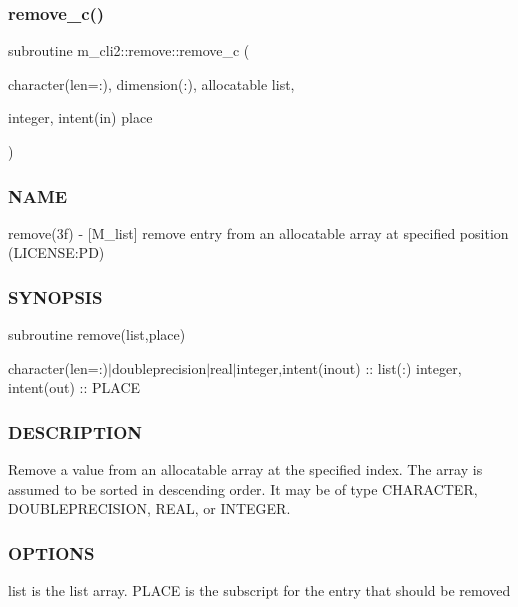 \subsubsection{\texorpdfstring{remove\+\_\+c()}{remove\_c()}}
{\footnotesize\ttfamily subroutine m\+\_\+cli2\+::remove\+::remove\+\_\+c (\begin{DoxyParamCaption}\item[{character(len=\+:), dimension(\+:), allocatable}]{list,  }\item[{integer, intent(in)}]{place }\end{DoxyParamCaption})\hspace{0.3cm}{\ttfamily [private]}}



\subsubsection*{N\+A\+ME}

remove(3f) -\/ \mbox{[}M\+\_\+list\mbox{]} remove entry from an allocatable array at specified position (L\+I\+C\+E\+N\+SE\+:PD) 

\subsubsection*{S\+Y\+N\+O\+P\+S\+IS}

subroutine remove(list,place)

character(len=\+:)$\vert$doubleprecision$\vert$real$\vert$integer,intent(inout) \+:\+: list(\+:) integer, intent(out) \+:\+: P\+L\+A\+CE

\subsubsection*{D\+E\+S\+C\+R\+I\+P\+T\+I\+ON}

\begin{DoxyVerb}Remove a value from an allocatable array at the specified index.
The array is assumed to be sorted in descending order. It may be of
type CHARACTER, DOUBLEPRECISION, REAL, or INTEGER.
\end{DoxyVerb}


\subsubsection*{O\+P\+T\+I\+O\+NS}

\begin{DoxyVerb}list    is the list array.
PLACE   is the subscript for the entry that should be removed
\end{DoxyVerb}


